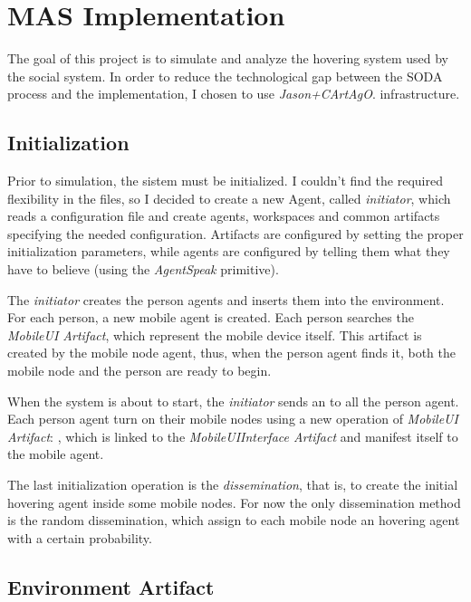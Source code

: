 \section{MAS Implementation}
\label{sec:implementation}

The goal of this project is to simulate and analyze the
hovering system used by the social system. In order to
reduce the technological gap between the SODA process and
the implementation, I chosen to use \emph{Jason+CArtAgO}\cite{cartago,jaslide,cartex}.
infrastructure.

\subsection{Initialization}

Prior to simulation, the sistem must be initialized. I couldn't find the
required flexibility in the  files, so I decided to create a new
Agent, called \emph{initiator}, which reads a configuration file and create
agents, workspaces and common artifacts specifying the needed configuration.
Artifacts are configured by setting the proper initialization parameters, while
agents are configured by telling them what they have to believe (using the
\emph{AgentSpeak}  primitive).

The \emph{initiator} creates the person agents and inserts them into the
environment. For each person, a new mobile agent is created. Each person
searches the \emph{MobileUI Artifact}, which represent the mobile device
itself. This artifact is created by the mobile node agent, thus, when the
person agent finds it, both the mobile node and the person are ready to begin.

When the system is about to start, the \emph{initiator} sends an
 to all the person agent. Each person agent turn on their
mobile nodes using a new operation of \emph{MobileUI Artifact}:
, which is linked to the \emph{MobileUIInterface Artifact}
and manifest itself to the mobile agent.

The last initialization operation is the \emph{dissemination}, that is, to
create the initial hovering agent inside some mobile nodes. For now the only
dissemination method is the random dissemination, which assign to each mobile
node an hovering agent with a certain probability.

\subsection{Environment Artifact}

